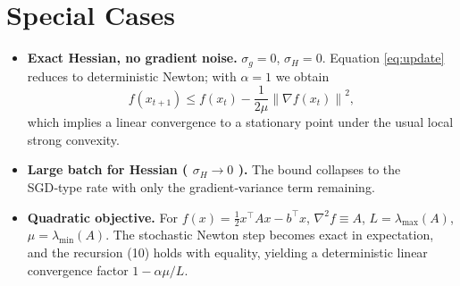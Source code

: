 \documentclass{article}
\newcommand{\norm}[1]{\left\|#1\right\|}
\newcommand{\grad}{\nabla}
\newcommand{\hess}{\nabla^{2}}
\begin{document}
\section*{Special Cases}
\begin{itemize}
\item \textbf{Exact Hessian, no gradient noise.} $\sigma_{g}=0$, $\sigma_{H}=0$. Equation \eqref{eq:update} reduces to deterministic Newton; with $\alpha=1$ we obtain
\[
f(x_{t+1})\le f(x_{t})-\frac{1}{2\mu}\norm{\grad f(x_{t})}^{2},
\]
which implies a linear convergence to a stationary point under the usual local strong convexity.
\item \textbf{Large batch for Hessian ( $\sigma_{H}\to0$ ).} The bound collapses to the SGD‑type rate with only the gradient‑variance term remaining.
\item \textbf{Quadratic objective.} For $f(x)=\frac12 x^{\top}Ax-b^{\top}x$, $\hess f\equiv A$, $L=\lambda_{\max}(A)$, $\mu=\lambda_{\min}(A)$. The stochastic Newton step becomes exact in expectation, and the recursion (10) holds with equality, yielding a deterministic linear convergence factor $1-\alpha\mu/L$.
\end{itemize}
\end{document}
